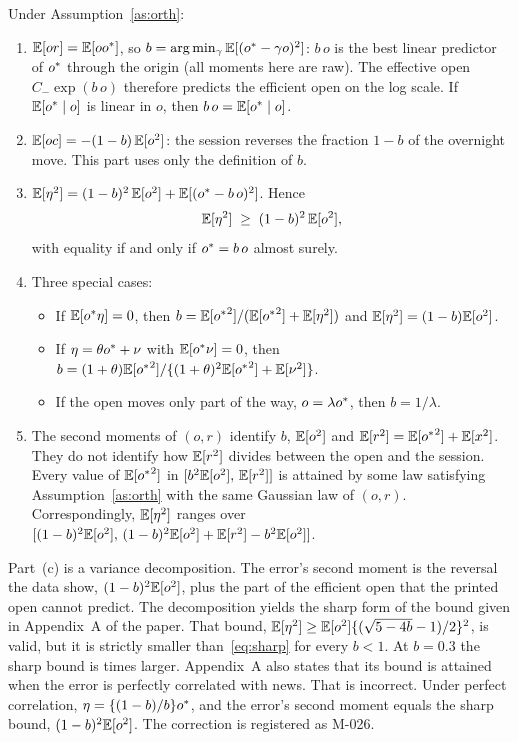 \begin{proposition}[Identification]\label{prop:ident}
Under Assumption~\ref{as:orth}:
\begin{enumerate}[label=(\alph*)]
  \item $\mathbb{E}[or]=\mathbb{E}[o{o^{*}}]$, so $b=\arg\min_\gamma \mathbb{E}[({o^{*}}-\gamma o)^2]$: $b\,o$ is the best linear
        predictor of ${o^{*}}$ through the origin (all moments here are raw). The effective open
        $C_{-}\exp(b\,o)$ therefore predicts the efficient open on the log scale. If
        $\mathbb{E}[{o^{*}}\mid o]$ is linear in $o$, then $b\,o=\mathbb{E}[{o^{*}}\mid o]$.
  \item $\mathbb{E}[oc]=-(1-b)\,\mathbb{E}[o^2]$: the session reverses the fraction $1-b$ of the overnight move.
        This part uses only the definition of $b$.
  \item $\mathbb{E}[\eta^2]=(1-b)^2\,\mathbb{E}[o^2]+\mathbb{E}[({o^{*}}-b\,o)^2]$. Hence
        \begin{equation}\label{eq:sharp}
          \mathbb{E}[\eta^2]\;\ge\;(1-b)^2\,\mathbb{E}[o^2],
        \end{equation}
        with equality if and only if ${o^{*}}=b\,o$ almost surely.
  \item Three special cases:
        \begin{itemize}
          \item If $\mathbb{E}[{o^{*}}\eta]=0$, then $b=\mathbb{E}[{o^{*}}^2]/(\mathbb{E}[{o^{*}}^2]+\mathbb{E}[\eta^2])$ and
                $\mathbb{E}[\eta^2]=(1-b)\mathbb{E}[o^2]$.
          \item If $\eta=\theta{o^{*}}+\nu$ with $\mathbb{E}[{o^{*}}\nu]=0$, then
                $b=(1+\theta)\mathbb{E}[{o^{*}}^2]/\{(1+\theta)^2\mathbb{E}[{o^{*}}^2]+\mathbb{E}[\nu^2]\}$.
          \item If the open moves only part of the way, $o=\lambda{o^{*}}$, then $b=1/\lambda$.
        \end{itemize}
  \item The second moments of $(o,r)$ identify $b$, $\mathbb{E}[o^2]$ and $\mathbb{E}[r^2]=\mathbb{E}[{o^{*}}^2]+\mathbb{E}[x^2]$.
        They do not identify how $\mathbb{E}[r^2]$ divides between the open and the session. Every value
        of $\mathbb{E}[{o^{*}}^2]$ in $[b^2\mathbb{E}[o^2],\,\mathbb{E}[r^2]]$ is attained by some law satisfying
        Assumption~\ref{as:orth} with the same Gaussian law of $(o,r)$. Correspondingly,
        $\mathbb{E}[\eta^2]$ ranges over $[(1-b)^2\mathbb{E}[o^2],\,(1-b)^2\mathbb{E}[o^2]+\mathbb{E}[r^2]-b^2\mathbb{E}[o^2]]$.
\end{enumerate}
\end{proposition}

Part~(c) is a variance decomposition. The error's second moment is the reversal the data show,
$(1-b)^2\mathbb{E}[o^2]$, plus the part of the efficient open that the printed open cannot predict.
The decomposition yields the sharp form of the bound given in Appendix~A of the paper. That
bound, $\mathbb{E}[\eta^2]\ge \mathbb{E}[o^2]\{(\sqrt{5-4b}-1)/2\}^2$, is valid, but it is strictly smaller
than~\eqref{eq:sharp} for every $b<1$. At $b=0.3$ the sharp bound is  times
larger. Appendix~A also states that its bound is attained when the error is perfectly correlated
with news. That is incorrect. Under perfect correlation, $\eta=\{(1-b)/b\}{o^{*}}$, and the error's
second moment equals the sharp bound, $(1-b)^2\mathbb{E}[o^2]$. The correction is registered as M-026.

